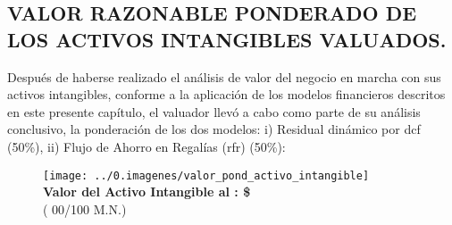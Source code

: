 \subsection{VALOR RAZONABLE PONDERADO DE LOS ACTIVOS INTANGIBLES VALUADOS.}

Despu\'es de haberse realizado el an\'alisis de valor del negocio en marcha con sus activos intangibles, conforme a la aplicaci\'on de los modelos financieros descritos en este presente cap\'itulo, el valuador llev\'o a cabo como parte de su an\'alisis conclusivo, la ponderaci\'on de los dos modelos: i) Residual din\'amico por \gls{dcf} (50\%), ii) Flujo de Ahorro en Regal\'ias (\gls{rfr}) (50\%):

\begin{figure}[H]
\centering
\texttt{[image: ../0.imagenes/valor\_pond\_activo\_intangible]}\\[10pt]

\textbf{\textcolor{principal}{Valor del Activo Intangible al \fechaValoresCorto:} \$\valorActivoIntangible{} \monedaCode}\\[5pt]
(\textcolor{principal}{\valorActivoIntangibleLetra{} \moneda{} 00/100 M.N.})


\end{figure}


